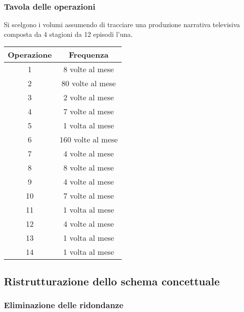 \documentclass{article}
\begin{document}
\subsubsection{Tavola delle operazioni}
Si scelgono i volumi assumendo di tracciare una produzione narrativa
televisiva composta da 4 stagioni da 12 episodi l'una.
\begin{center}\begin{tabular}{ |c|c| }
		\hline
		\textbf{Operazione} & \textbf{Frequenza} \\
		\hline
		1                   & 8 volte al mese    \\
		\hline
		2                   & 80 volte al mese   \\
		\hline
		3                   & 2 volte al mese    \\
		\hline
		4                   & 7 volte al mese    \\
		\hline
		5                   & 1 volta al mese    \\
		\hline
		6                   & 160 volte al mese  \\
		\hline
		7                   & 4 volte al mese    \\
		\hline
		8                   & 8 volte al mese    \\
		\hline
		9                   & 4 volte al mese    \\
		\hline
		10                  & 7 volte al mese    \\
		\hline
		11                  & 1 volta al mese    \\
		\hline
		12                  & 4 volte al mese    \\
		\hline
		13                  & 1 volta al mese    \\
		\hline
		14                  & 1 volta al mese    \\
		\hline
	\end{tabular}\end{center}

\subsection{Ristrutturazione dello schema concettuale}

\subsubsection{Eliminazione delle ridondanze}
\end{document}
